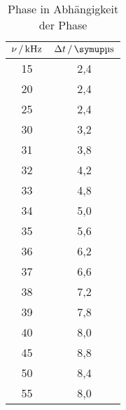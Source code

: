 \begin{table}
  \centering
  \begin{tabular}{c c}
    \toprule
    $\nu\,/\,\si{\kilo\hertz}$ & $\Delta t\,/\,\su{\si{\micro\second}}$ \\
    \midrule
    15    &    2,4   \\
    20    &    2,4   \\
    25    &    2,4   \\
    30    &    3,2   \\
    31    &    3,8   \\
    32    &    4,2   \\
    33    &    4,8   \\
    34    &    5,0   \\
    35    &    5,6   \\
    36    &    6,2   \\
    37    &    6,6   \\
    38    &    7,2   \\
    39    &    7,8   \\
    40    &    8,0   \\
    45    &    8,8   \\
    50    &    8,4   \\
    55    &    8,0   \\
    \bottomrule
  \end{tabular}
  \caption{Phase in Abhängigkeit der Phase}
  \label{tab:phase}
\end{table}
